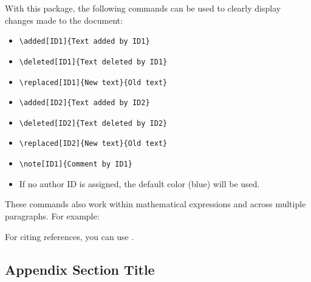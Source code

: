 \documentclass[usletter,12pt]{article}
\begin{document}
With this package, the following commands can be used to clearly display changes made to the document:
\begin{itemize}
    \item \texttt{\textbackslash added[ID1]\{Text added by ID1\}} 
    \item \texttt{\textbackslash deleted[ID1]\{Text deleted by ID1\}} 
    \item \texttt{\textbackslash replaced[ID1]\{New text\}\{Old text\}} 
    \item \texttt{\textbackslash added[ID2]\{Text added by ID2\}} 
    \item \texttt{\textbackslash deleted[ID2]\{Text deleted by ID2\}} 
    \item \texttt{\textbackslash replaced[ID2]\{New text\}\{Old text\}} 
    \item \texttt{\textbackslash note[ID1]\{Comment by ID1\}} 
    \item If no author ID is assigned, the default color (blue) will be used. 
\end{itemize}

These commands also work within mathematical expressions and across multiple paragraphs. For example:



For citing references, you can use \citep{Cyrus2018RobustAcceleratedOptimization}.

\newpage



\newpage
\begin{appendices}
\section{Appendix Section Title}
\end{appendices}
\end{document}
